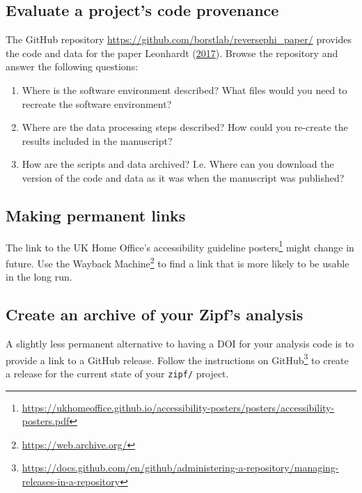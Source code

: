 \documentclass[
]{krantz}
\providecommand{\tightlist}{%
  \setlength{\itemsep}{0pt}\setlength{\parskip}{0pt}}
\renewcommand{\href}[2]{#2\footnote{\url{#1}}}
\begin{document}
\hypertarget{provenance-ex-eval-code}{%
\subsection{Evaluate a project's code provenance}\label{provenance-ex-eval-code}}

The GitHub repository \url{https://github.com/borstlab/reversephi_paper/} provides the code and data for the paper Leonhardt (\protect\hyperlink{ref-Leon2017}{2017}).
Browse the repository and answer the following questions:

\begin{enumerate}
\def\labelenumi{\arabic{enumi}.}
\tightlist
\item
  Where is the software environment described? What files would you need to recreate the software environment?
\item
  Where are the data processing steps described? How could you re-create the results included in the manuscript?
\item
  How are the scripts and data archived?
  I.e. Where can you download the version of the code and data as it was when the manuscript was published?
\end{enumerate}

\hypertarget{provenance-ex-permanent-links}{%
\subsection{Making permanent links}\label{provenance-ex-permanent-links}}

The link to the UK Home Office's \href{https://ukhomeoffice.github.io/accessibility-posters/posters/accessibility-posters.pdf}{accessibility guideline posters} might change in future.
Use the \href{https://web.archive.org/}{Wayback Machine} to find a link that is more likely to be usable in the long run.

\hypertarget{provenance-ex-release}{%
\subsection{Create an archive of your Zipf's analysis}\label{provenance-ex-release}}

A slightly less permanent alternative to having a DOI for your analysis code
is to provide a link to a GitHub release.
Follow \href{https://docs.github.com/en/github/administering-a-repository/managing-releases-in-a-repository}{the instructions on GitHub} to create a release for the current state of your \texttt{zipf/} project.
\end{document}
